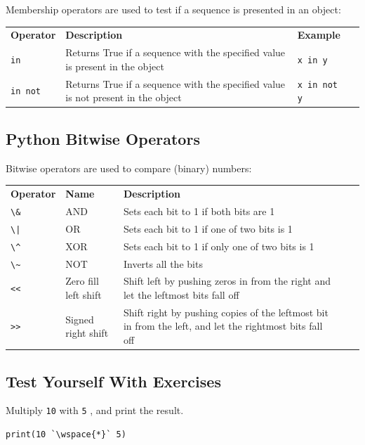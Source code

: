 \documentclass[12pt,a4paper]{article}
\newcommand{\wspace}[1]{%
	\color{white}\colorbox{white}{\texttt{#1}}%
}
\newcommand{\code}[1]{%
	\colorbox{backcolour}{\lstinline{#1}}%
}
\newcommand{\lcode}[1]{%
	\lstinline{#1}%
}
\newcommand{\trcol}[3]{%
	#1 \quad  & #2 & #3 \\
}
\begin{document}
Membership operators are used to test if a sequence is presented in an object:

\begin{table}[h]
	\begin{center}
		\begin{tabularx}{\textwidth}{lXll}
\trcol{\bfseries Operator}{\bfseries Description}
			{\bfseries Example}
\trcol{\lcode{in}}{Returns True if a sequence with the specified value is present in the object}
			{\lcode{x in y}}
\trcol{\lcode{in not}}{Returns True if a sequence with the specified value is not present in the object}
			{\lcode{x in not y}}
		\end{tabularx}
	\end{center}
\end{table}
\subsection{Python Bitwise Operators}

Bitwise operators are used to compare (binary) numbers:

\begin{table}[h]
	\begin{center}
		\begin{tabularx}{\textwidth}{llXlX}
\trcol{\bfseries Operator}{\bfseries Name}
	{\bfseries Description}
\trcol{\lcode{\&}}{AND}
	{Sets each bit to 1 if both bits are 1}
\trcol{\lcode{\|}}{OR}
	{Sets each bit to 1 if one of two bits is 1}
\trcol{\lcode{\^}}{XOR}
	{Sets each bit to 1 if only one of two bits is 1}
\trcol{\lcode{\~}}{NOT}
	{Inverts all the bits}
\trcol{\lcode{<<}}{Zero fill left shift}
	{Shift left by pushing zeros in from the right and let the leftmost bits fall off}
\trcol{\lcode{>>}}{Signed right shift}
	{Shift right by pushing copies of the leftmost bit in from the left, and let the rightmost bits fall off}
		\end{tabularx}
	\end{center}
\end{table}
\subsection{Test Yourself With Exercises}

\begin{tbox}
Multiply \code{10} with \code{5}, and print the result.

\begin{lstlisting}[numbers=none]
print(10 `\wspace{*}` 5)
\end{lstlisting}
\end{tbox}
\vfill\newpage
\end{document}
